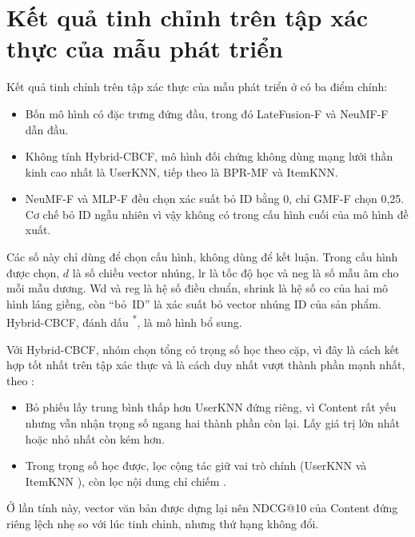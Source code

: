 \section{Kết quả tinh chỉnh trên tập xác thực của mẫu phát triển}
\label{sec:tuning_results}

Kết quả tinh chỉnh trên tập xác thực của mẫu phát triển ở  có ba điểm chính:
\begin{itemize}
    \item Bốn mô hình có đặc trưng đứng đầu, trong đó LateFusion-F và NeuMF-F dẫn đầu.
    \item Không tính Hybrid-CBCF, mô hình đối chứng không dùng mạng lưới thần kinh cao nhất là UserKNN, tiếp theo là BPR-MF và ItemKNN.
    \item NeuMF-F và MLP-F đều chọn xác suất bỏ ID bằng 0, chỉ GMF-F chọn 0,25. Cơ chế bỏ ID ngẫu nhiên vì vậy không có trong cấu hình cuối của mô hình đề xuất.
\end{itemize}

Các số này chỉ dùng để chọn cấu hình, không dùng để kết luận. Trong cấu hình được chọn, $d$ là số chiều vector nhúng, lr là tốc độ học và neg là số mẫu âm cho mỗi mẫu dương. Wd và reg là hệ số điều chuẩn, shrink là hệ số co của hai mô hình láng giềng, còn ``bỏ~ID'' là xác suất bỏ vector nhúng ID của sản phẩm. Hybrid-CBCF, đánh dấu \textsuperscript{*}, là mô hình bổ sung.


Với Hybrid-CBCF, nhóm chọn tổng có trọng số học theo cặp, vì đây là cách kết hợp tốt nhất trên tập xác thực và là cách duy nhất vượt thành phần mạnh nhất, theo :
\begin{itemize}
    \item Bỏ phiếu lấy trung bình thấp hơn UserKNN đứng riêng, vì Content rất yếu nhưng vẫn nhận trọng số ngang hai thành phần còn lại. Lấy giá trị lớn nhất hoặc nhỏ nhất còn kém hơn.
    \item Trong trọng số học được, lọc cộng tác giữ vai trò chính (UserKNN  và ItemKNN ), còn lọc nội dung chỉ chiếm .
\end{itemize}

Ở lần tính này, vector văn bản được dựng lại nên NDCG@10 của Content đứng riêng lệch nhẹ so với lúc tinh chỉnh, nhưng thứ hạng không đổi.


